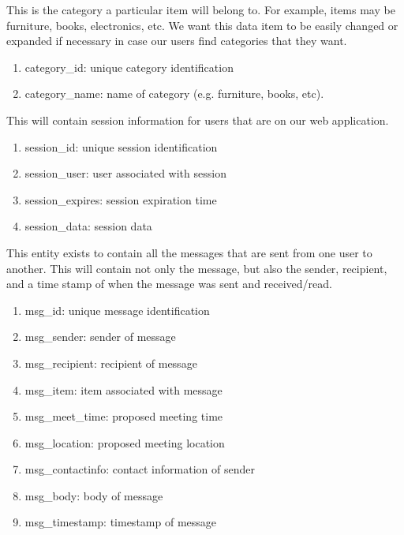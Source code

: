 \begin{description}[font=\bfseries\itshape]
\item[category:] This is the category a particular item will belong to.  For example, items may be furniture, books, electronics, etc.  We want this data item to be easily changed or expanded if necessary in case our users find categories that they want.
\begin{enumerate}
\item category\_id: unique category identification
\item category\_name: name of category (e.g. furniture, books, etc).
\end{enumerate}

\item[session:] This will contain session information for users that are on our web application.
\begin{enumerate}
\item session\_id: unique session identification
\item session\_user: user associated with session
\item session\_expires: session expiration time
\item session\_data: session data
\end{enumerate}
	
\item[message:] This entity exists to contain all the messages that are sent from one user to another.  This will contain not only the message, but also the sender, recipient, and a time stamp of when the message was sent and received/read.
\begin{enumerate}
\item msg\_id: unique message identification
\item msg\_sender: sender of message
\item msg\_recipient: recipient of message
\item msg\_item: item associated with message
\item msg\_meet\_time: proposed meeting time
\item msg\_location: proposed meeting location
\item msg\_contactinfo: contact information of sender
\item msg\_body: body of message
\item msg\_timestamp: timestamp of message
\end{enumerate}
	

\end{description}
